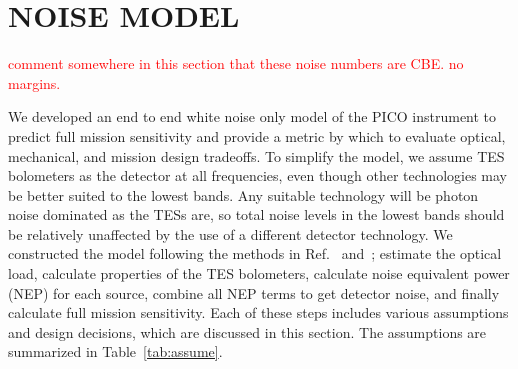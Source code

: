 \documentclass[]{spie}  %
\newcommand{\comr}[1]{\textcolor{red}{#1}}
\begin{document}







\section{NOISE MODEL}
\label{sec:noise}
\comr{comment somewhere in this section that these noise numbers are CBE. no margins.}

We developed an end to end white noise only model of the PICO instrument to predict full mission sensitivity and 
provide a metric by which to evaluate optical, mechanical, and mission design tradeoffs.  
To simplify the model, we assume TES bolometers as the detector at all frequencies, even though other technologies may be better suited to the lowest bands.  
Any suitable technology will be photon noise dominated as the TESs are, so total noise levels in the lowest bands should be relatively unaffected by 
the use of a different detector technology.
We constructed the model following the methods in Ref.~ and~; estimate the 
optical load, calculate properties of the TES bolometers, calculate noise equivalent power (NEP) for each source, combine all NEP  
terms to get detector noise, and finally calculate full mission sensitivity.  Each of these steps includes various assumptions and design decisions, 
which are discussed in this section.  The assumptions are summarized in Table~\ref{tab:assume}.
\end{document}
